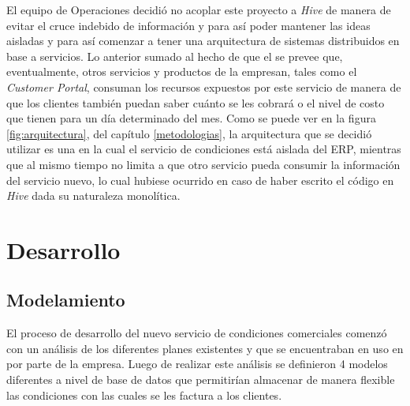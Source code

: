   El equipo de Operaciones decidió no acoplar este proyecto a \textit{Hive} de manera de evitar el cruce indebido de información y para así poder mantener las ideas aisladas y para así comenzar a tener una arquitectura de sistemas distribuidos en base a servicios. Lo anterior sumado al hecho de que el se prevee que, eventualmente, otros servicios y productos de la empresan, tales como el \textit{Customer Portal}, consuman los recursos expuestos por este servicio de manera de que los clientes también puedan saber cuánto se les cobrará o el nivel de costo que tienen para un día determinado del mes. Como se puede ver en la figura \ref{fig:arquitectura}, del capítulo \ref{metodologias}, la arquitectura que se decidió utilizar es una en la cual el servicio de condiciones está aislada del ERP, mientras que al mismo tiempo no limita a que otro servicio pueda consumir la información del servicio nuevo, lo cual hubiese ocurrido en caso de haber escrito el código en \textit{Hive} dada su naturaleza monolítica.

\section{Desarrollo}

  \subsection{Modelamiento}
    \label{modelamiento}

    El proceso de desarrollo del nuevo servicio de condiciones comerciales comenzó con un análisis de los diferentes planes existentes y que se encuentraban en uso en por parte de la empresa. Luego de realizar este análisis se definieron 4 modelos diferentes a nivel de base de datos que permitirían almacenar de manera flexible las condiciones con las cuales se les factura a los clientes. 
    
